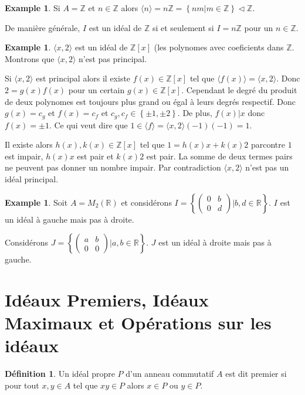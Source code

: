 \documentclass{book}
\newcommand{\ideal}{\vartriangleleft}
\theoremstyle{plain}
\theoremstyle{definition}
\newtheorem{defn}[thm]{Définition} %
\newtheorem{ex}[thm]{Example} %
\begin{document}
\begin{ex}
Si $A=\mathbb{Z}$ et $n\in\mathbb{Z}$ alors $\langle n\rangle=n\mathbb{Z}=\left\{nm | m\in\mathbb{Z}\right\}\ideal\mathbb{Z}$.

De manière générale, $I$ est un idéal de $\mathbb{Z}$ si et seulement si $I=n\mathbb{Z}$ pour un $n\in\mathbb{Z}$.
\end{ex}

\begin{ex}
$\langle x,2\rangle$ est un idéal de $\mathbb{Z}[x]$ (les polynomes avec coeficients dans $\mathbb{Z}$. Montrons que $\langle x,2\rangle$ n'est pas principal.

Si $\langle x,2\rangle$ est principal alors il existe $f(x)\in\mathbb{Z}[x]$ tel que $\langle f(x)\rangle=\langle x,2\rangle$. Donc $2=g(x)f(x)$ pour un certain $g(x)\in\mathbb{Z}[x]$. Cependant le degré du produit de deux polynomes  est toujours plus grand ou égal à leurs degrés respectif. Donc $g(x)=c_g$ et $f(x)=c_f$ et $c_g,c_f\in\left\{\pm1,\pm2\right\}$. De plus, $f(x)|x$ donc $f(x)=\pm1$. Ce qui veut dire que $1\in\langle f \rangle=\langle x,2\rangle(-1)(-1)=1$. 

Il existe alors $h(x),k(x)\in\mathbb{Z}[x]$ tel que $1=h(x)x+k(x)2$ parcontre $1$ est impair, $h(x)x$ est pair et $k(x)2$ est pair. La somme de deux termes pairs ne peuvent pas donner un nombre impair. Par contradiction $\langle x,2\rangle$ n'est pas un idéal principal.
\end{ex}

\begin{ex}
Soit $A=M_2\left(\mathbb{R}\right)$ et considérons $I=\left\{ \left( 
\begin{array}{cc}
0&b\\
0&d
\end{array}
\right) | b,d\in\mathbb{R}\right\}$. $I$ est un idéal à gauche mais pas à droite.

Considérons $J=\left\{ \left( 
\begin{array}{cc}
a&b\\
0&0
\end{array}
\right) | a,b\in\mathbb{R}\right\}$. $J$ est un idéal à droite mais pas à gauche.
\end{ex}

\section{Idéaux Premiers, Idéaux Maximaux et Opérations sur les idéaux}
\begin{defn}
Un idéal propre $P$ d'un anneau commutatif $A$ est dit premier si pour tout $x,y\in A$ tel que $xy\in P$ alors $x\in P$ ou $y\in P$.
\end{defn}
\end{document}
